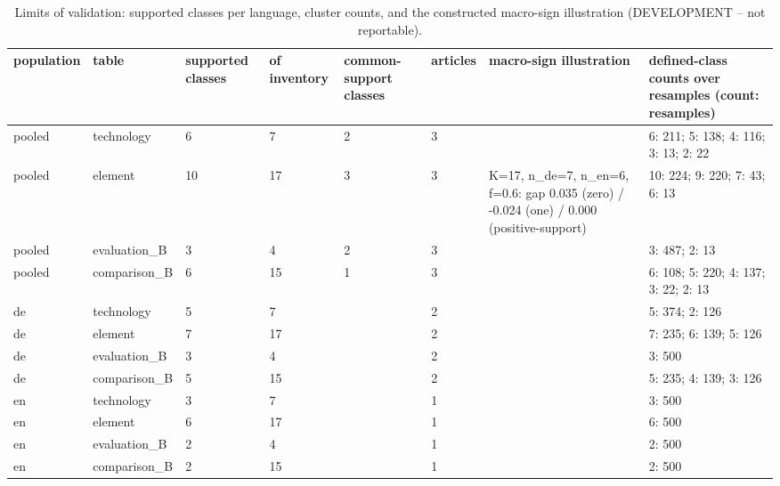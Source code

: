\begin{table}[htbp]
\centering
\small
\begin{tabular}{llllllll}
\toprule
\textbf{population} & \textbf{table} & \textbf{supported classes} & \textbf{of inventory} & \textbf{common-support classes} & \textbf{articles} & \textbf{macro-sign illustration} & \textbf{defined-class counts over resamples (count: resamples)} \\
\midrule
pooled & technology & 6 & 7 & 2 & 3 &  & 6: 211; 5: 138; 4: 116; 3: 13; 2: 22 \\
pooled & element & 10 & 17 & 3 & 3 & K=17, n\_de=7, n\_en=6, f=0.6: gap 0.035 (zero) / -0.024 (one) / 0.000 (positive-support) & 10: 224; 9: 220; 7: 43; 6: 13 \\
pooled & evaluation\_B & 3 & 4 & 2 & 3 &  & 3: 487; 2: 13 \\
pooled & comparison\_B & 6 & 15 & 1 & 3 &  & 6: 108; 5: 220; 4: 137; 3: 22; 2: 13 \\
de & technology & 5 & 7 &  & 2 &  & 5: 374; 2: 126 \\
de & element & 7 & 17 &  & 2 &  & 7: 235; 6: 139; 5: 126 \\
de & evaluation\_B & 3 & 4 &  & 2 &  & 3: 500 \\
de & comparison\_B & 5 & 15 &  & 2 &  & 5: 235; 4: 139; 3: 126 \\
en & technology & 3 & 7 &  & 1 &  & 3: 500 \\
en & element & 6 & 17 &  & 1 &  & 6: 500 \\
en & evaluation\_B & 2 & 4 &  & 1 &  & 2: 500 \\
en & comparison\_B & 2 & 15 &  & 1 &  & 2: 500 \\
\bottomrule
\end{tabular}
\caption{Limits of validation: supported classes per language, cluster counts, and the constructed macro-sign illustration (DEVELOPMENT -- not reportable).}
\end{table}
